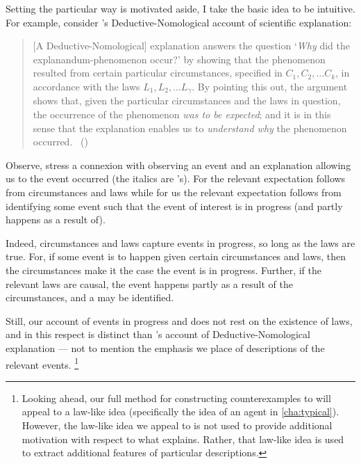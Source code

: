 \begin{note}%
  \nocite{Bromberger:1966aa}%
  Setting the particular way \progEx{} is motivated aside, I take the basic idea to be intuitive.
  For example, consider \citeauthor{Hempel:1965aa}'s Deductive-Nomological account of scientific explanation:
  \begin{quote}
    [A Deductive-Nomological] explanation answers the question
    `\emph{Why} did the explanandum-phenomenon occur?'
    by showing that the phenomenon resulted from certain particular circumstances, specified in \(C_{1}, C_{2}, \dots C_{k}\), in accordance with the laws \(L_{1}, L_{2}, \dots L_{\gamma}\).
    By pointing this out, the argument shows that, given the particular circumstances and the laws in question, the occurrence of the phenomenon \emph{was to be expected}; and it is in this sense that the explanation enables us to \emph{understand why} the phenomenon occurred.%
    \mbox{ }\hfill\mbox{(\citeyear[337]{Hempel:1965aa})}
  \end{quote}
  Observe, \citeauthor{Hempel:1965aa} stress a connexion with observing an event  and an explanation allowing us to  the event occurred (the italics are \citeauthor{Hempel:1965aa}'s).
  For \citeauthor{Hempel:1965aa} the relevant expectation follows from circumstances and laws while for us the relevant expectation follows from identifying some event such that the event of interest is in progress (and partly happens as a result of).

  Indeed, circumstances and laws capture events in progress, so long as the laws are true.
  For, if some event is to happen given certain circumstances and laws, then the circumstances make it the case the event is in progress.
  Further, if the relevant laws are causal, the event happens partly as a result of the circumstances, and a \se{} may be identified.

  Still, our account of events in progress and \se{} does not rest on the existence of laws, and in this respect \progExI{} is distinct than \citeauthor{Hempel:1965aa}'s account of Deductive-Nomological explanation --- not to mention the emphasis we place of descriptions of the relevant events.%
  \footnote{
    Looking ahead, our full method for constructing counterexamples to \issueInclusion{} will appeal to a law-like idea (specifically the idea of an agent \tC{} in \autoref{cha:typical}).
    However, the law-like idea we appeal to is not used to provide additional motivation with respect to what explains.
    Rather, that law-like idea is used to extract additional features of particular descriptions.
  }
\end{note}



